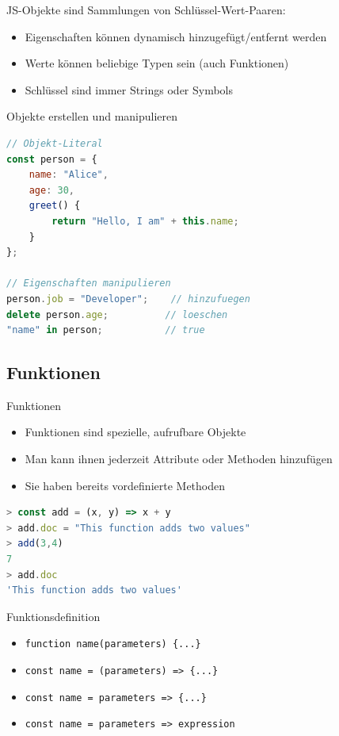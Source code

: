 \begin{definition}{JS-Objekte}
    sind Sammlungen von Schlüssel-Wert-Paaren:
    \begin{itemize}
        \item Eigenschaften können dynamisch hinzugefügt/entfernt werden
        \item Werte können beliebige Typen sein (auch Funktionen)
        \item Schlüssel sind immer Strings oder Symbols
    \end{itemize}
\end{definition}

\begin{examplecode}{Objekte erstellen und manipulieren}
\begin{lstlisting}[language=JavaScript, style=basesmol]
// Objekt-Literal
const person = {
    name: "Alice",
    age: 30,
    greet() {
        return "Hello, I am" + this.name;
    }
};

// Eigenschaften manipulieren
person.job = "Developer";    // hinzufuegen
delete person.age;          // loeschen
"name" in person;           // true
\end{lstlisting}
\end{examplecode}

\subsection{Funktionen}

\begin{definition}{Funktionen}
    \begin{itemize}
        \item Funktionen sind spezielle, aufrufbare Objekte
        \item Man kann ihnen jederzeit Attribute oder Methoden hinzufügen
        \item Sie haben bereits vordefinierte Methoden
      \end{itemize}
\begin{lstlisting}[language=JavaScript, style=basesmol]
> const add = (x, y) => x + y
> add.doc = "This function adds two values"
> add(3,4)
7
> add.doc
'This function adds two values'
\end{lstlisting}
\end{definition}

\begin{KR}{Funktionsdefinition}
    \begin{itemize}
        \item \texttt{function name(parameters) \{...\}}
        \item \texttt{const name = (parameters) => \{...\}}
        \item \texttt{const name = parameters => \{...\}}
        \item \texttt{const name = parameters => expression}
    \end{itemize}
\end{KR}


